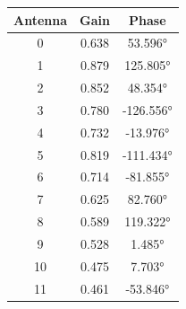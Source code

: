 \begin{table}[h]
    \centering
    \begin{subtable}[t]{0.4\textwidth}
        \begin{tabular}{ccc}
            \hline
            {Antenna} & {Gain} & {Phase}   \\
            \hline
            0         & 0.638  & 53.596°   \\
            1         & 0.879  & 125.805°  \\
            2         & 0.852  & 48.354°   \\
            3         & 0.780  & -126.556° \\
            4         & 0.732  & -13.976°  \\
            5         & 0.819  & -111.434° \\
            6         & 0.714  & -81.855°  \\
            7         & 0.625  & 82.760°   \\
            8         & 0.589  & 119.322°  \\
            9         & 0.528  & 1.485°    \\
            10        & 0.475  & 7.703°    \\
            11        & 0.461  & -53.846°  \\
            \hline
        \end{tabular}
        \label{tab:tx_gains}


\end{subtable}
\end{table}

